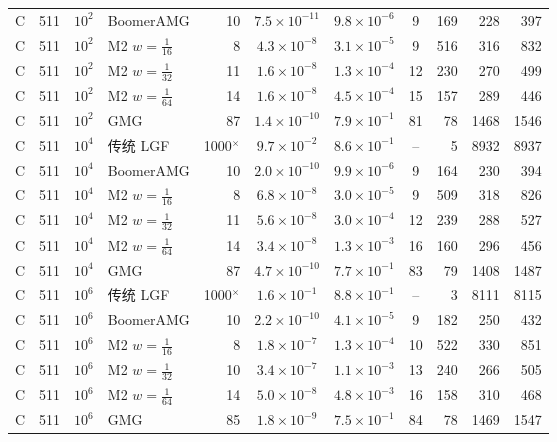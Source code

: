 \begin{longtable}{lrrlrcccrrr}
C & 511 & $10^{2}$ & BoomerAMG & 10 & $7.5{\times}10^{-11}$ & $9.8{\times}10^{-6}$ & 9 & 169 & 228 & 397 \\
C & 511 & $10^{2}$ & M2 $w{=}\frac1{16}$ & 8 & $4.3{\times}10^{-8}$ & $3.1{\times}10^{-5}$ & 9 & 516 & 316 & 832 \\
C & 511 & $10^{2}$ & M2 $w{=}\frac1{32}$ & 11 & $1.6{\times}10^{-8}$ & $1.3{\times}10^{-4}$ & 12 & 230 & 270 & 499 \\
C & 511 & $10^{2}$ & M2 $w{=}\frac1{64}$ & 14 & $1.6{\times}10^{-8}$ & $4.5{\times}10^{-4}$ & 15 & 157 & 289 & 446 \\
C & 511 & $10^{2}$ & GMG & 87 & $1.4{\times}10^{-10}$ & $7.9{\times}10^{-1}$ & 81 & 78 & 1468 & 1546 \\
C & 511 & $10^{4}$ & 传统 LGF & 1000$^\times$ & $9.7{\times}10^{-2}$ & $8.6{\times}10^{-1}$ & -- & 5 & 8932 & 8937 \\
C & 511 & $10^{4}$ & BoomerAMG & 10 & $2.0{\times}10^{-10}$ & $9.9{\times}10^{-6}$ & 9 & 164 & 230 & 394 \\
C & 511 & $10^{4}$ & M2 $w{=}\frac1{16}$ & 8 & $6.8{\times}10^{-8}$ & $3.0{\times}10^{-5}$ & 9 & 509 & 318 & 826 \\
C & 511 & $10^{4}$ & M2 $w{=}\frac1{32}$ & 11 & $5.6{\times}10^{-8}$ & $3.0{\times}10^{-4}$ & 12 & 239 & 288 & 527 \\
C & 511 & $10^{4}$ & M2 $w{=}\frac1{64}$ & 14 & $3.4{\times}10^{-8}$ & $1.3{\times}10^{-3}$ & 16 & 160 & 296 & 456 \\
C & 511 & $10^{4}$ & GMG & 87 & $4.7{\times}10^{-10}$ & $7.7{\times}10^{-1}$ & 83 & 79 & 1408 & 1487 \\
C & 511 & $10^{6}$ & 传统 LGF & 1000$^\times$ & $1.6{\times}10^{-1}$ & $8.8{\times}10^{-1}$ & -- & 3 & 8111 & 8115 \\
C & 511 & $10^{6}$ & BoomerAMG & 10 & $2.2{\times}10^{-10}$ & $4.1{\times}10^{-5}$ & 9 & 182 & 250 & 432 \\
C & 511 & $10^{6}$ & M2 $w{=}\frac1{16}$ & 8 & $1.8{\times}10^{-7}$ & $1.3{\times}10^{-4}$ & 10 & 522 & 330 & 851 \\
C & 511 & $10^{6}$ & M2 $w{=}\frac1{32}$ & 10 & $3.4{\times}10^{-7}$ & $1.1{\times}10^{-3}$ & 13 & 240 & 266 & 505 \\
C & 511 & $10^{6}$ & M2 $w{=}\frac1{64}$ & 14 & $5.0{\times}10^{-8}$ & $4.8{\times}10^{-3}$ & 16 & 158 & 310 & 468 \\
C & 511 & $10^{6}$ & GMG & 85 & $1.8{\times}10^{-9}$ & $7.5{\times}10^{-1}$ & 84 & 78 & 1469 & 1547 \\

\end{longtable}
